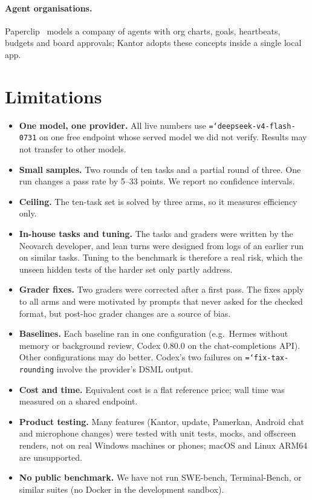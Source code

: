 \documentclass[11pt]{article}
\newcommand{\code}[1]{\texttt{\hyphenchar\font=`\-\relax #1}}
\begin{document}
\paragraph{Agent organisations.} Paperclip~\citep{paperclip} models a company of agents with org charts, goals, heartbeats, budgets and board approvals; Kantor adopts these concepts inside a single local app.

\section{Limitations}
\label{sec:limits}
\begin{itemize}
\item \textbf{One model, one provider.} All live numbers use \code{deepseek-v4-flash-0731} on one free endpoint whose served model we did not verify. Results may not transfer to other models.
\item \textbf{Small samples.} Two rounds of ten tasks and a partial round of three. One run changes a pass rate by 5--33 points. We report no confidence intervals.
\item \textbf{Ceiling.} The ten-task set is solved by three arms, so it measures efficiency only.
\item \textbf{In-house tasks and tuning.} The tasks and graders were written by the Neovarch developer, and lean turns were designed from logs of an earlier run on similar tasks. Tuning to the benchmark is therefore a real risk, which the unseen hidden tests of the harder set only partly address.
\item \textbf{Grader fixes.} Two graders were corrected after a first pass. The fixes apply to all arms and were motivated by prompts that never asked for the checked format, but post-hoc grader changes are a source of bias.
\item \textbf{Baselines.} Each baseline ran in one configuration (e.g.\ Hermes without memory or background review, Codex 0.80.0 on the chat-completions API). Other configurations may do better. Codex's two failures on \code{fix-tax-rounding} involve the provider's DSML output.
\item \textbf{Cost and time.} Equivalent cost is a flat reference price; wall time was measured on a shared endpoint.
\item \textbf{Product testing.} Many features (Kantor, update, Pamerkan, Android chat and microphone changes) were tested with unit tests, mocks, and offscreen renders, not on real Windows machines or phones; macOS and Linux ARM64 are unsupported.
\item \textbf{No public benchmark.} We have not run SWE-bench, Terminal-Bench, or similar suites (no Docker in the development sandbox).
\end{itemize}
\end{document}
